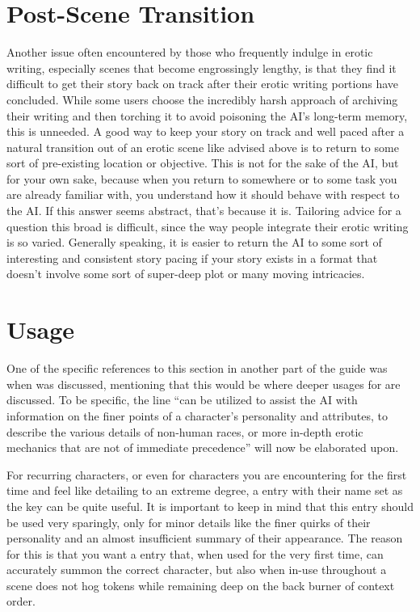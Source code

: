 \documentclass[Source-main.tex]{subfiles}
\begin{document}
\section{Post-Scene Transition}
\label{subsec:p-stransition}

Another issue often encountered by those who frequently indulge in erotic writing, especially scenes that become engrossingly lengthy, is that they find it difficult to get their story back on track after their erotic writing portions have concluded.
While some users choose the incredibly harsh approach of archiving their writing and then torching it to avoid poisoning the AI’s long-term memory, this is unneeded.
A good way to keep your story on track and well paced after a natural transition out of an erotic scene like advised above is to return to some sort of pre-existing location or objective.
This is not for the sake of the AI, but for your own sake, because when you return to somewhere or to some task you are already familiar with, you understand how it should behave with respect to the AI.
If this answer seems abstract, that’s because it is.
Tailoring advice for a question this broad is difficult, since the way people integrate their erotic writing is so varied.
Generally speaking, it is easier to return the AI to some sort of interesting and consistent story pacing if your story exists in a format that doesn’t involve some sort of super-deep plot or many moving intricacies.

\section{\wi Usage}
\label{sec:wiusage}

One of the specific references to this section in another part of the guide was when \wi was discussed, mentioning that this would be where deeper usages for \wi are discussed.
To be specific, the line “\wi can be utilized to assist the AI with information on the finer points of a character’s personality and attributes, to describe the various details of non-human races, or more in-depth erotic mechanics that are not of immediate precedence” will now be elaborated upon.

For recurring characters, or even for characters you are encountering for the first time and feel like detailing to an extreme degree, a \wi entry with their name set as the key can be quite useful.
It is important to keep in mind that this entry should be used very sparingly, only for minor details like the finer quirks of their personality and an almost insufficient summary of their appearance.
The reason for this is that you want a \wi entry that, when used for the very first time, can accurately summon the correct character, but also when in-use throughout a scene does not hog tokens while remaining deep on the back burner of context order.
\end{document}

